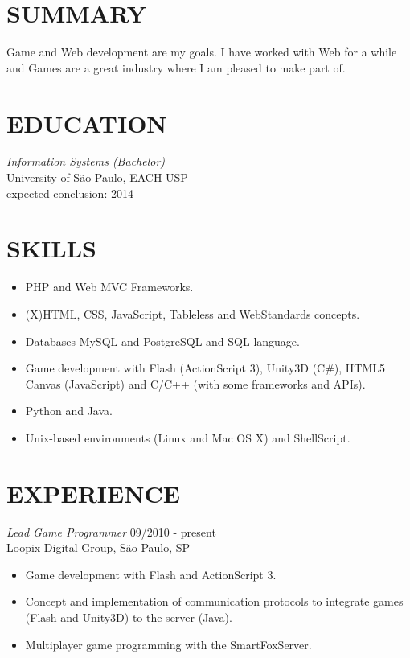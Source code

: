 \documentclass[line,margin]{res}
\begin{document}

\address{Av. Sete de Setembro, 1256 - Guarulhos - São Paulo}
\address{(11) 9932-6440 - bruno@croci.me - http://bruno.croci.me/}

 
\begin{resume}
 
\section{SUMMARY} Game and Web development are my goals. I have worked with Web for a while and Games are a great industry where I am pleased to make part of.
 
 
\section{EDUCATION} {\sl Information Systems (Bachelor)} \\
                University of São Paulo, EACH-USP \\
                expected conclusion: 2014
                
 
\section{SKILLS} \begin{itemize}  \itemsep -2pt
                 \item PHP and Web MVC Frameworks.
                 \item (X)HTML, CSS, JavaScript, Tableless and WebStandards concepts.
                 \item Databases MySQL and PostgreSQL and SQL language.
                 \item Game development with Flash (ActionScript 3), Unity3D (C\#),
                       HTML5 Canvas (JavaScript) and C/C++ (with some frameworks and APIs).
                 \item Python and Java.
                 \item Unix-based environments (Linux and Mac OS X) and ShellScript.
                 \end{itemize}
 
\section{EXPERIENCE} {\sl Lead Game Programmer} \hfill 09/2010 - present \\
                Loopix Digital Group, São Paulo, SP
                 \begin{itemize}  \itemsep -2pt %
                 \item Game development with Flash and ActionScript 3.
                 \item Concept and implementation of communication protocols to integrate games (Flash and Unity3D) to the server (Java).
                 \item Multiplayer game programming with the SmartFoxServer.
                 \end{itemize}
 

\end{resume}
\end{document}
